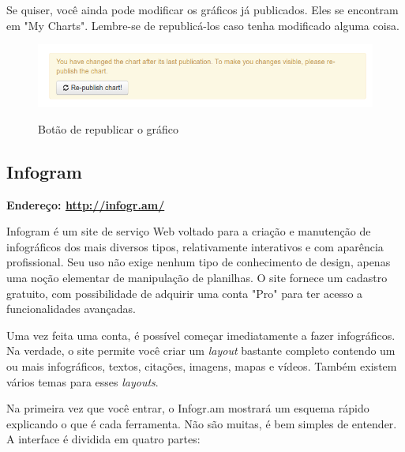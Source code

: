 \documentclass[12pt,onecolumn]{article}
\begin{document}
    Se quiser, você ainda pode modificar os gráficos já publicados. Eles se encontram
    em "My Charts". Lembre-se de republicá-los caso tenha modificado alguma coisa.

  \begin{figure}[H]
    \begin{center}
      \includegraphics[scale=0.5]{datawrapper-republish}
      \label{fig:datawrapper-republish}
      \caption{Botão de republicar o gráfico}
    \end{center}
  \end{figure}

  \subsection{Infogram}
    \textbf{Endereço: \url{http://infogr.am/}}
    
    Infogram é um site de serviço Web voltado para a criação e manutenção de
    infográficos dos mais diversos tipos, relativamente interativos e com
    aparência profissional. Seu uso não exige nenhum tipo de conhecimento de
    design, apenas uma noção elementar de manipulação de planilhas. O site fornece
    um cadastro gratuito, com possibilidade de adquirir uma conta "Pro" para ter
    acesso a funcionalidades avançadas.
    
    Uma vez feita uma conta, é possível começar imediatamente a fazer
    infográficos. Na verdade, o site permite você criar um \textit{layout}
    bastante completo contendo um ou mais infográficos, textos, citações, imagens,
    mapas e vídeos. Também existem vários temas para esses \textit{layouts}.
    
    Na primeira vez que você entrar, o Infogr.am mostrará um esquema rápido
    explicando o que é cada ferramenta. Não são muitas, é bem simples de entender.
    A interface é dividida em quatro partes:
    
\end{document}
